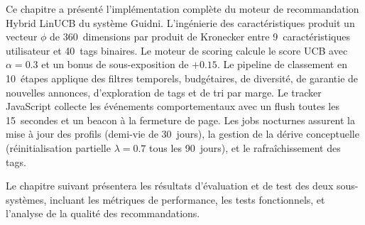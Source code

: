 Ce chapitre a présenté l'implémentation complète du moteur de recommandation Hybrid LinUCB du
système Guidni. L'ingénierie des caractéristiques produit un vecteur $\phi$ de 360~dimensions
par produit de Kronecker entre 9~caractéristiques utilisateur et 40~tags binaires. Le moteur
de scoring calcule le score UCB avec $\alpha = 0.3$ et un bonus de sous-exposition de $+0.15$.
Le pipeline de classement en 10~étapes applique des filtres temporels, budgétaires, de
diversité, de garantie de nouvelles annonces, d'exploration de tags et de tri par marge. Le
tracker JavaScript collecte les événements comportementaux avec un flush toutes les
15~secondes et un beacon à la fermeture de page. Les jobs nocturnes assurent la mise à jour
des profils (demi-vie de 30~jours), la gestion de la dérive conceptuelle (réinitialisation
partielle $\lambda = 0.7$ tous les 90~jours), et le rafraîchissement des tags.

Le chapitre suivant présentera les résultats d'évaluation et de test des deux sous-systèmes,
incluant les métriques de performance, les tests fonctionnels, et l'analyse de la qualité des
recommandations.
